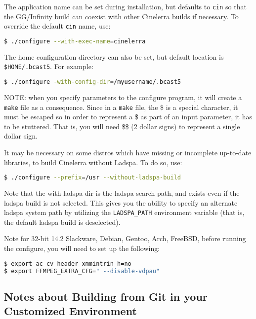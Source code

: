 The application name can be set during installation, but defaults to \texttt{cin} so that the GG/Infinity build can coexist with other Cinelerra builds if necessary.  To override the default \texttt{cin} name, use:	
\begin{lstlisting}[language=bash,numbers=none]
$ ./configure --with-exec-name=cinelerra
\end{lstlisting}

The home configuration directory can also be set, but default location is \texttt{\$HOME/.bcast5}.  
For example:

\begin{lstlisting}[language=bash,numbers=none]
$ ./configure -with-config-dir=/myusername/.bcast5
\end{lstlisting}

NOTE:  when you specify parameters to the configure program, it will create a \texttt{make} file as a consequence.  
Since in a \texttt{make} file, the \$ is a special character, it must be escaped so in order to represent a \$ as part of an input parameter, it has to be stuttered.  
That is, you will need \$\$ (2 dollar signs) to represent a single dollar sign. 

It may be necessary on some distros which have missing or incomplete up-to-date libraries, to build Cinelerra without Ladspa.  
To do so, use:

\begin{lstlisting}[language=bash,numbers=none]
$ ./configure --prefix=/usr --without-ladspa-build
\end{lstlisting}

Note that the with-ladspa-dir is the ladspa search path, and exists even if the ladspa build is not selected.  This gives you the ability to specify an alternate ladspa system path by utilizing the \texttt{LADSPA\_PATH} environment variable (that is, the default ladspa build is deselected).

Note for 32-bit 14.2 Slackware, Debian, Gentoo, Arch, FreeBSD, before running the configure, you will need to set up the following:

\begin{lstlisting}[language=bash,numbers=none]
$ export ac_cv_header_xmmintrin_h=no
$ export FFMPEG_EXTRA_CFG=" --disable-vdpau"
\end{lstlisting}

\subsection{Notes about Building from Git in your Customized Environment}%
\label{sub:notes_about_building_from_git_in_your_customized_environment}

